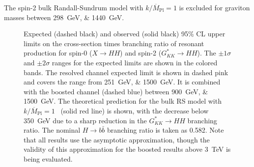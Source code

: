 The spin-2 bulk Randall-Sundrum model with $k/\overline{M}_{\mathrm{Pl}} = 1$ is excluded for 
graviton masses between \SIlist{298;1440}{\GeV}.
\begin{figure}[ht]
  \centering
  \vspace*{-3cm}

  \caption{\label{fig:res-limits}
    Expected (dashed black) and observed (solid black) 95\% CL upper limits on the cross-section times branching ratio of resonant production for spin-0 (\(X \rightarrow HH\)) and spin-2 (\(G_{KK}^{*} \rightarrow HH\)). 
    The \(\pm 1\sigma\) and \(\pm 2\sigma\) ranges for the expected limits are shown in the colored bands. 
    The resolved channel expected limit is shown in dashed pink and covers the range from \SIlist{251;1500}{\GeV}. 
    It is combined with the boosted channel (dashed blue) between \SIlist{900;1500}{\GeV}.
    The theoretical prediction for the bulk RS model with \(k/\overline{M}_{\mathrm{Pl}} = 1\)~\cite{Carvalho} 
    (solid red line) is shown, with the decrease below \SI{350}{\GeV} due to a sharp reduction in the \(G_{KK}^{*} \rightarrow HH\) branching ratio. The nominal \(H \rightarrow b\bar{b}\) branching ratio is taken as 0.582. Note 
    that all results use the asymptotic approximation, though the validity of this approximation for the boosted results 
    above \SI{3}{\TeV} is being evaluated.}
\end{figure}

